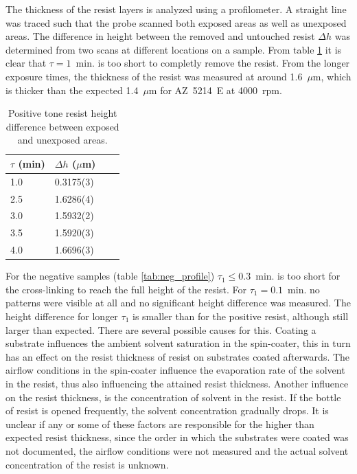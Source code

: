 The thickness of the resist layers is analyzed using a profilometer. A straight line was traced such that the probe scanned both exposed areas as well as  unexposed areas. The difference in height between the removed and untouched resist $\Delta h$ was determined from two scans at different locations on a sample. From table \ref{tab:pos_profile} it is clear that $\tau = 1$~min. is too short to completly remove the resist. From the longer exposure times, the thickness of the resist was measured at around 1.6~$\mu$m, which is thicker than the expected 1.4~$\mu$m for AZ~5214~E at 4000~rpm.
\begin{table}[H]
    \centering
    \caption{Positive tone resist height difference between exposed and unexposed areas.}
    \begin{tabular}{X l l l}
        $\tau$ (min)& $\Delta h$ ($\mu$m) \\
        \hline\hline
        1.0 & 0.3175(3) \\
        2.5 & 1.6286(4) \\
        3.0 & 1.5932(2) \\
        3.5 & 1.5920(3) \\
        4.0 & 1.6696(3) \\
        \hline
    \end{tabular}
    \label{tab:pos_profile}
\end{table} For the negative samples (table \ref{tab:neg_profile}) $\tau_1 \leq 0.3$~min. is too short for the cross-linking to reach the full height of the resist. For $\tau_1 = 0.1$~min. no patterns were visible at all and no significant height difference was measured. The height difference for longer $\tau_1$ is smaller than for the positive resist, although still larger than expected. There are several possible causes for this. Coating a substrate influences the ambient solvent saturation in the spin-coater, this in turn has an effect on the resist thickness of resist on substrates coated afterwards. The airflow conditions in the spin-coater influence the evaporation rate of the solvent in the resist, thus also influencing the attained resist thickness. Another influence on the resist thickness, is the concentration of solvent in the resist. If the bottle of resist is opened frequently, the solvent concentration gradually drops. It is unclear if any or some of these factors are responsible for the higher than expected resist thickness, since the order in which the substrates were coated was not documented, the airflow conditions were not measured and the actual solvent concentration of the resist is unknown.
